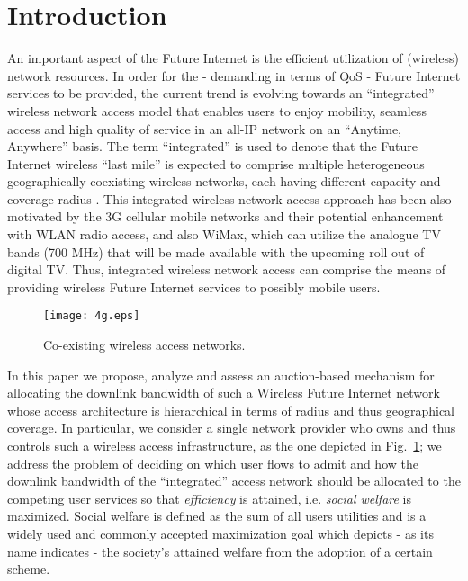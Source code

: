 \documentclass[a4paper]{article}
\begin{document}
\makeRR   

\section{Introduction}\label{sec:intro}

An important aspect of the Future Internet is the efficient utilization of
(wireless) network resources. In order for the - demanding in terms of QoS
- Future Internet services to be provided, the current trend is evolving 
towards an ``integrated'' wireless network access model that enables 
users to enjoy mobility, seamless access and high 
quality of service in an all-IP network on an ``Anytime, Anywhere'' basis.
The term ``integrated'' is used to denote that the Future Internet wireless 
``last mile'' is expected to comprise multiple heterogeneous geographically 
coexisting wireless networks, each having different capacity and coverage 
radius \cite{thesis}. This integrated wireless network access approach has been 
also motivated by the 3G cellular mobile networks and their potential enhancement 
with WLAN radio access, 
and also WiMax,  which can  
utilize the analogue TV bands (700 MHz) that will be made available 
with the upcoming roll out of digital TV. 
Thus, integrated wireless network access can comprise the 
means of providing wireless Future Internet services to possibly mobile users.

\begin{figure}[htbp]
	\centering\texttt{[image: 4g.eps]}
	\caption{Co-existing wireless access networks.}
	\label{fig:4g}
\end{figure}

In this paper we propose, analyze and assess an auction-based mechanism 
for allocating the downlink bandwidth 
of such a Wireless Future Internet network whose access architecture is 
hierarchical in terms of radius and thus geographical coverage. 
In particular, we consider a single network
provider who owns and thus controls such a wireless access infrastructure,
as the one depicted in Fig.~\ref{fig:4g};  
we address the problem of deciding on which user flows to admit  
and how the downlink bandwidth of the ``integrated'' access network
should be allocated to the competing user services 
so that {\em efficiency} is attained, i.e. {\em social welfare} is maximized. 
Social welfare is defined as the sum of all users utilities and is a widely
used and commonly accepted maximization goal which depicts - as its name indicates - 
the society's attained welfare from the adoption of a certain scheme.
\end{document}
